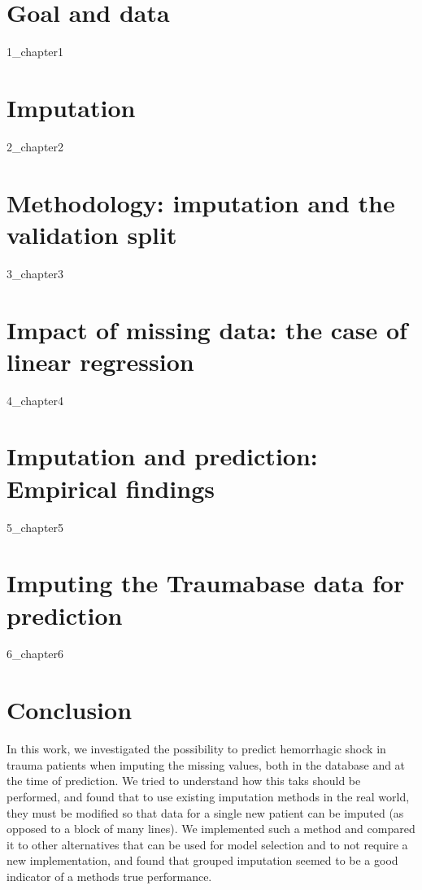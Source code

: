 \documentclass[12pt, a4paper]{memoir}
\begin{document}

\chapter{Goal and data}
\label{data}
 {1_chapter1}

\chapter{Imputation}
\label{imputation}
{2_chapter2}
		
\chapter{Methodology: imputation and the validation split}
\label{validation}
{3_chapter3}
		
		
\chapter{Impact of missing data: the case of linear regression}
\label{linreg}
{4_chapter4} 

\chapter{Imputation and prediction: Empirical findings}
\label{empirical}
{5_chapter5}

\chapter{Imputing the Traumabase data for prediction}
\label{analysis}
{6_chapter6}

\chapter*{Conclusion}
In this work, we investigated the possibility to predict hemorrhagic shock in trauma patients when imputing the missing values, both in the database and at the time of prediction. We tried to understand how this taks should be performed, and found that to use existing imputation methods in the real world, they must be modified so that data for a single new patient can be imputed (as opposed to a block of many lines). We implemented such a method and compared it to other alternatives that can be used for model selection and to not require a new implementation, and found that grouped imputation seemed to be a good indicator of a methods true performance.
\end{document}
